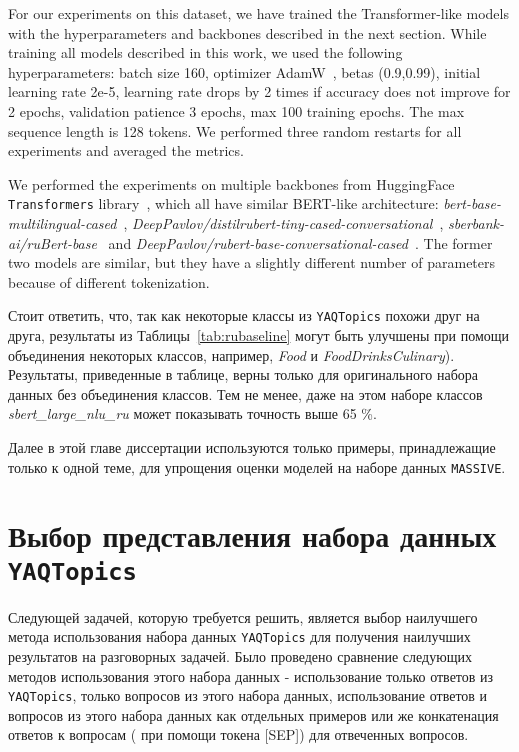 For our experiments on this dataset, we have trained the Transformer-like models with the hyperparameters and backbones described in the next section.
While training all models described in this work, we used the following hyperparameters: batch size 160, optimizer AdamW~\cite{adam}, betas (0.9,0.99), initial learning rate 2e-5, learning rate drops by 2 times if accuracy does not improve for 2 epochs, validation patience 3 epochs, max 100 training epochs. The max sequence length is 128 tokens. We performed three random restarts for all experiments and averaged the metrics.

We performed the experiments on multiple backbones from HuggingFace \texttt{Transformers} library~\cite{huggingface_transformers}, which all have similar BERT-like architecture:  \textit{bert-base-multilingual-cased}~\cite{multilingual_bert}, \textit{DeepPavlov/distilrubert-tiny-cased-conversational}~\cite{alina}, \textit{sberbank-ai/ruBert-base}~\cite{sbert_base} and \textit{DeepPavlov/rubert-base-conversational-cased}~\cite{rubert}. The former two models are similar, but they have a slightly different number of parameters because of different tokenization.


Стоит ответить, что, так как некоторые классы из \texttt{YAQTopics} похожи друг на друга, результаты из Таблицы~\ref{tab:rubaseline} могут быть улучшены при помощи объединения некоторых классов, например, \textit{Food} и \textit{FoodDrinksCulinary}). Результаты, приведенные в таблице, верны только для оригинального набора данных без объединения классов. Тем не менее, даже на этом наборе классов \textit{sbert\_large\_nlu\_ru} может показывать точность выше 65 \%.


Далее в этой главе диссертации используются только примеры, принадлежащие только к одной теме, для упрощения оценки моделей на наборе данных \texttt{MASSIVE}.

\section{Выбор представления набора данных \texttt{YAQTopics}} 

Следующей задачей, которую требуется решить, является выбор наилучшего метода использования набора данных \texttt{YAQTopics} для получения наилучших результатов на разговорных задачей. Было проведено сравнение следующих методов использования этого набора данных - использование только ответов из \texttt{YAQTopics}, только вопросов из этого набора данных, использование ответов и вопросов из этого набора данных как отдельных примеров или же конкатенация ответов к вопросам ( при помощи токена [SEP]) для отвеченных вопросов.


